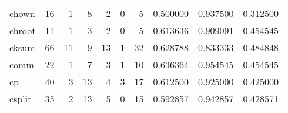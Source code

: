\begin{tabular}{lrrrrrrrrr}
chown     &                                      16 &                                                  1 &                                                  8 &                                                  2 &                                                  0 &                                                  5 &                                           0.500000 &                               0.937500 &                             0.312500 \\
chroot    &                                      11 &                                                  1 &                                                  3 &                                                  2 &                                                  0 &                                                  5 &                                           0.613636 &                               0.909091 &                             0.454545 \\
cksum     &                                      66 &                                                 11 &                                                  9 &                                                 13 &                                                  1 &                                                 32 &                                           0.628788 &                               0.833333 &                             0.484848 \\
comm      &                                      22 &                                                  1 &                                                  7 &                                                  3 &                                                  1 &                                                 10 &                                           0.636364 &                               0.954545 &                             0.454545 \\
cp        &                                      40 &                                                  3 &                                                 13 &                                                  4 &                                                  3 &                                                 17 &                                           0.612500 &                               0.925000 &                             0.425000 \\
csplit    &                                      35 &                                                  2 &                                                 13 &                                                  5 &                                                  0 &                                                 15 &                                           0.592857 &                               0.942857 &                             0.428571 \\

\end{tabular}
